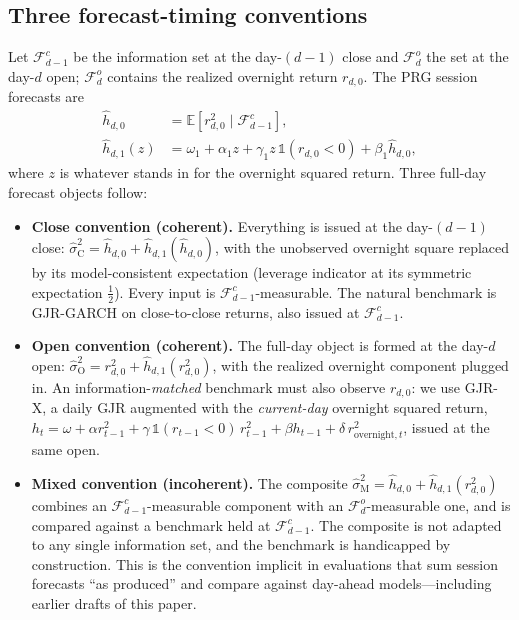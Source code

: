 \documentclass[11pt,a4paper]{article}
\begin{document}
\subsection{Three forecast-timing conventions}
\label{sec:conventions}

Let $\mathcal{F}^{c}_{d-1}$ be the information set at the day-$(d-1)$ close and $\mathcal{F}^{o}_{d}$ the set at the day-$d$ open; $\mathcal{F}^{o}_{d}$ contains the realized overnight return $r_{d,0}$. The PRG session forecasts are
\begin{align}
    \hat{h}_{d,0} &= \mathbb{E}\!\left[r^2_{d,0} \mid \mathcal{F}^{c}_{d-1}\right],
    \label{eq:h_ov} \\
    \hat{h}_{d,1}(z) &= \omega_{1} + \alpha_{1} z + \gamma_{1} z\,\mathbb{1}(r_{d,0}<0) + \beta_{1} \hat{h}_{d,0},
    \label{eq:h_in}
\end{align}
where $z$ is whatever stands in for the overnight squared return. Three full-day forecast objects follow:

\begin{itemize}
\item \textbf{Close convention (coherent).} Everything is issued at the day-$(d-1)$ close: $\hat{\sigma}^2_{\text{C}} = \hat{h}_{d,0} + \hat{h}_{d,1}(\hat{h}_{d,0})$, with the unobserved overnight square replaced by its model-consistent expectation (leverage indicator at its symmetric expectation $\tfrac12$). Every input is $\mathcal{F}^{c}_{d-1}$-measurable. The natural benchmark is GJR-GARCH \citep{Glosten1993} on close-to-close returns, also issued at $\mathcal{F}^{c}_{d-1}$.
\item \textbf{Open convention (coherent).} The full-day object is formed at the day-$d$ open: $\hat{\sigma}^2_{\text{O}} = r^2_{d,0} + \hat{h}_{d,1}(r^2_{d,0})$, with the realized overnight component plugged in. An information-\emph{matched} benchmark must also observe $r_{d,0}$: we use GJR-X, a daily GJR augmented with the \emph{current-day} overnight squared return,
$h_t = \omega + \alpha r^2_{t-1} + \gamma\,\mathbb{1}(r_{t-1}<0)\,r^2_{t-1} + \beta h_{t-1} + \delta\, r^2_{\text{overnight},t}$,
issued at the same open.
\item \textbf{Mixed convention (incoherent).} The composite $\hat{\sigma}^2_{\text{M}} = \hat{h}_{d,0} + \hat{h}_{d,1}(r^2_{d,0})$ combines an $\mathcal{F}^{c}_{d-1}$-measurable component with an $\mathcal{F}^{o}_{d}$-measurable one, and is compared against a benchmark held at $\mathcal{F}^{c}_{d-1}$. The composite is not adapted to any single information set, and the benchmark is handicapped by construction. This is the convention implicit in evaluations that sum session forecasts ``as produced'' and compare against day-ahead models---including earlier drafts of this paper.
\end{itemize}
\end{document}
